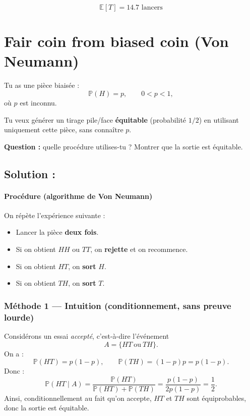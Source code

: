 \[
\boxed{\mathbb{E}[T] = 14.7 \text{ lancers}}
\]

\section{Fair coin from biased coin (Von Neumann)}

\begin{exerciseBox}
Tu as une pièce biaisée :
\[
\mathbb{P}(H)=p,\qquad 0<p<1,
\]
où $p$ est inconnu.

Tu veux générer un tirage pile/face \textbf{équitable} (probabilité $1/2$) en utilisant uniquement cette pièce, sans connaître $p$.

\textbf{Question :} quelle procédure utilises-tu ? Montrer que la sortie est équitable.
\end{exerciseBox}

\subsection*{Solution :}

\paragraph{Procédure (algorithme de Von Neumann)}
On répète l'expérience suivante :
\begin{itemize}
\item Lancer la pièce \textbf{deux fois}.
\item Si on obtient $HH$ ou $TT$, on \textbf{rejette} et on recommence.
\item Si on obtient $HT$, on \textbf{sort} $H$.
\item Si on obtient $TH$, on \textbf{sort} $T$.
\end{itemize}

\subsubsection*{Méthode 1 — Intuition (conditionnement, sans preuve lourde)}

Considérons un essai \emph{accepté}, c'est-à-dire l'événement
\[
A=\{HT\ \text{ou}\ TH\}.
\]
On a :
\[
\mathbb{P}(HT)=p(1-p),\qquad \mathbb{P}(TH)=(1-p)p=p(1-p).
\]
Donc :
\[
\mathbb{P}(HT\mid A)=\frac{\mathbb{P}(HT)}{\mathbb{P}(HT)+\mathbb{P}(TH)}
=\frac{p(1-p)}{2p(1-p)}=\frac12.
\]
Ainsi, conditionnellement au fait qu'on accepte, $HT$ et $TH$ sont équiprobables, donc la sortie est équitable.

